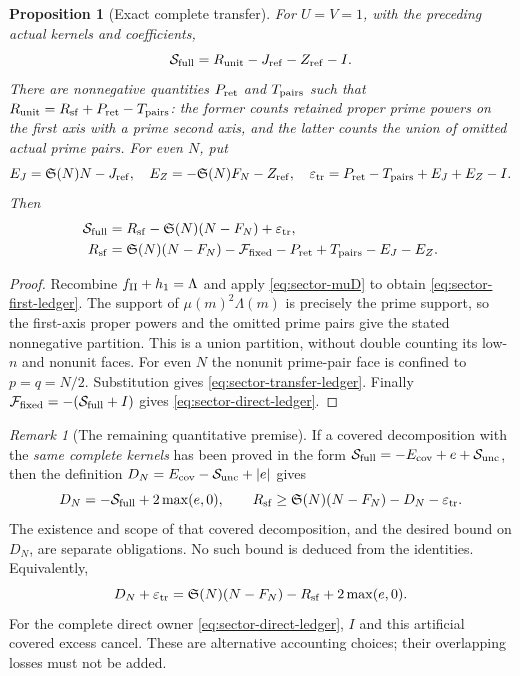 \documentclass[11pt,a4paper]{article}
\newtheorem{proposition}[theorem]{Proposition}
\theoremstyle{definition}
\theoremstyle{remark}
\newtheorem{remark}[theorem]{Remark}
\begin{document}
\begin{proposition}[Exact complete transfer]
\label{prop:sector-transfer}
For $U=V=1$, with the preceding actual kernels and coefficients,
\begin{equation}
 \mathcal S_{\rm full}=R_{\rm unit}-J_{\rm ref}-Z_{\rm ref}-I.
 \label{eq:sector-first-ledger}
\end{equation}
There are nonnegative quantities $P_{\rm ret}$ and $T_{\rm pairs}$
such that
$R_{\rm unit}=R_{\rm sf}+P_{\rm ret}-T_{\rm pairs}$: the former
counts retained proper prime powers on the first axis with a prime
second axis, and the latter counts the union of omitted actual prime
pairs.  For even $N$, put
\[
 E_J=\mathfrak S(N)N-J_{\rm ref},\quad
 E_Z=-\mathfrak S(N)F_N-Z_{\rm ref},\quad
 \varepsilon_{\rm tr}=P_{\rm ret}-T_{\rm pairs}+E_J+E_Z-I.
\]
Then
\begin{align}
 \mathcal S_{\rm full}
 &=R_{\rm sf}-\mathfrak S(N)(N-F_N)+\varepsilon_{\rm tr},
 \label{eq:sector-transfer-ledger}\\
 R_{\rm sf}
 &=\mathfrak S(N)(N-F_N)-\mathcal F_{\rm fixed}
                         -P_{\rm ret}+T_{\rm pairs}-E_J-E_Z.
 \label{eq:sector-direct-ledger}
\end{align}
\end{proposition}
\begin{proof}
Recombine $f_{\rm II}+h_1=\Lambda$ and apply
\eqref{eq:sector-muD} to obtain \eqref{eq:sector-first-ledger}.
The support of $\mu(m)^2\Lambda(m)$ is precisely the prime support,
so the first-axis proper powers and the omitted prime pairs give the
stated nonnegative partition.  This is a union partition, without
double counting its low-$n$ and nonunit faces.  For even $N$ the
nonunit prime-pair face is confined to $p=q=N/2$.  Substitution gives
\eqref{eq:sector-transfer-ledger}.  Finally
$\mathcal F_{\rm fixed}=-(\mathcal S_{\rm full}+I)$ gives
\eqref{eq:sector-direct-ledger}.
\end{proof}

\begin{remark}[The remaining quantitative premise]
If a covered decomposition with the \emph{same complete kernels}
has been proved in the form
$\mathcal S_{\rm full}=-E_{\rm cov}+e+\mathcal S_{\rm unc}$,
then the definition
$D_N=E_{\rm cov}-\mathcal S_{\rm unc}+|e|$ gives
\[
 D_N=-\mathcal S_{\rm full}+2\max(e,0),\qquad
 R_{\rm sf}\geq\mathfrak S(N)(N-F_N)-D_N-\varepsilon_{\rm tr}.
\]
The existence and scope of that covered decomposition, and the desired
bound on $D_N$, are separate obligations.  No such bound is deduced
from the identities.  Equivalently,
\[
 D_N+\varepsilon_{\rm tr}
 =\mathfrak S(N)(N-F_N)-R_{\rm sf}+2\max(e,0).
\]
For the complete direct owner \eqref{eq:sector-direct-ledger}, $I$
and this artificial covered excess cancel.  These are alternative
accounting choices; their overlapping losses must not be added.
\end{remark}
\end{document}
